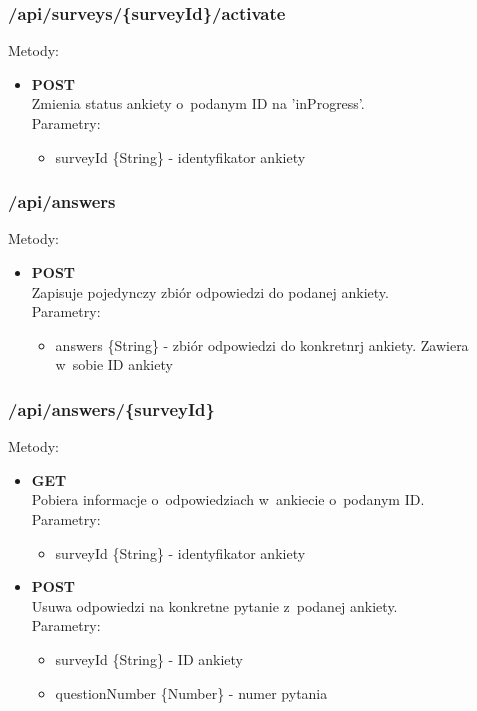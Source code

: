 \documentclass[12pt,a4paper,notitlepage]{article}
\begin{document}
\subsubsection{/api/surveys/\{surveyId\}/activate}
Metody:
\begin{itemize}
\item \textbf{POST} \\ Zmienia status ankiety o~podanym ID na 'inProgress'. \\ Parametry:
	\begin{itemize}
	\item surveyId \{String\} - identyfikator ankiety
	\end{itemize}

\end{itemize}

\subsubsection{/api/answers}
Metody:
\begin{itemize}
\item \textbf{POST} \\ Zapisuje pojedynczy zbiór odpowiedzi do podanej ankiety. \\ Parametry:
	\begin{itemize}
	\item answers \{String\} - zbiór odpowiedzi do konkretnrj ankiety. Zawiera w~sobie ID ankiety
	\end{itemize}

\end{itemize}

\subsubsection{/api/answers/\{surveyId\}}
Metody:
\begin{itemize}
\item \textbf{GET} \\ Pobiera informacje o~odpowiedziach w~ankiecie o~podanym ID. \\ Parametry:
	\begin{itemize}
	\item surveyId \{String\} - identyfikator ankiety
	\end{itemize}
\item \textbf{POST} \\ Usuwa odpowiedzi na konkretne pytanie z~podanej ankiety. \\ Parametry:
	\begin{itemize}
	\item surveyId \{String\} - ID ankiety
	\item questionNumber \{Number\} - numer pytania
	\end{itemize}

\end{itemize}
\newpage
\end{document}
